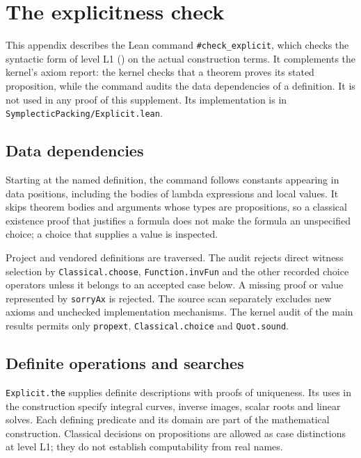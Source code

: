 \section{The explicitness check}\label{sec:xpl}

This appendix describes the Lean command \texttt{\#check\_explicit}, which checks the syntactic form of level L1
() on the actual construction terms. It complements the kernel's axiom report: the
kernel checks that a theorem proves its stated proposition, while the command audits the data dependencies of a
definition. It is not used in any proof of this supplement. Its implementation is in
\texttt{SymplecticPacking/Explicit.lean}.

\subsection{Data dependencies}\label{sec:xpl-traversal}

Starting at the named definition, the command follows constants appearing in
data positions, including the bodies of lambda expressions and local values.
It skips theorem bodies and arguments whose types are propositions, so a
classical existence proof that justifies a formula does not make the formula
an unspecified choice; a choice that supplies a value is inspected.

Project and vendored definitions are traversed. The audit rejects direct witness
selection by \texttt{Classical.choose}, \texttt{Function.invFun} and the other
recorded choice operators unless it belongs to an accepted case below.
A missing proof or value represented by \texttt{sorryAx} is rejected.
The source scan separately excludes new axioms and unchecked implementation
mechanisms. The kernel audit of the main results permits only
\texttt{propext}, \texttt{Classical.choice} and \texttt{Quot.sound}.

\subsection{Definite operations and searches}\label{sec:xpl-accept}

\texttt{Explicit.the} supplies definite descriptions with proofs of uniqueness.
Its uses in the construction specify integral
curves, inverse images, scalar roots and linear solves. Each defining predicate
and its domain are part of the mathematical construction. Classical decisions
on propositions are allowed as case distinctions at level L1; they do not
establish computability from real names.

